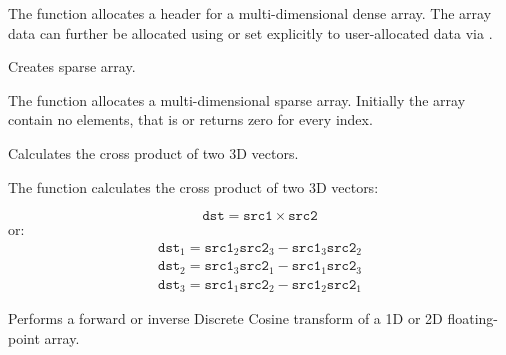 The function allocates a header for a multi-dimensional dense array. The array data can further be allocated using  or set explicitly to user-allocated data via .

Creates sparse array.


\begin{description}
\ifC
{}
\else
{}
\fi
{}
\end{description}

The function allocates a multi-dimensional sparse array. Initially the array contain no elements, that is  or  returns zero for every index.


Calculates the cross product of two 3D vectors.


\begin{description}
\end{description}


The function calculates the cross product of two 3D vectors:

\[ \texttt{dst} = \texttt{src1} \times \texttt{src2} \]
or:
\[
\begin{array}{l}
\texttt{dst}_1 = \texttt{src1}_2 \texttt{src2}_3 - \texttt{src1}_3 \texttt{src2}_2\\
\texttt{dst}_2 = \texttt{src1}_3 \texttt{src2}_1 - \texttt{src1}_1 \texttt{src2}_3\\
\texttt{dst}_3 = \texttt{src1}_1 \texttt{src2}_2 - \texttt{src1}_2 \texttt{src2}_1
\end{array}
\]

Performs a forward or inverse Discrete Cosine transform of a 1D or 2D floating-point array.



